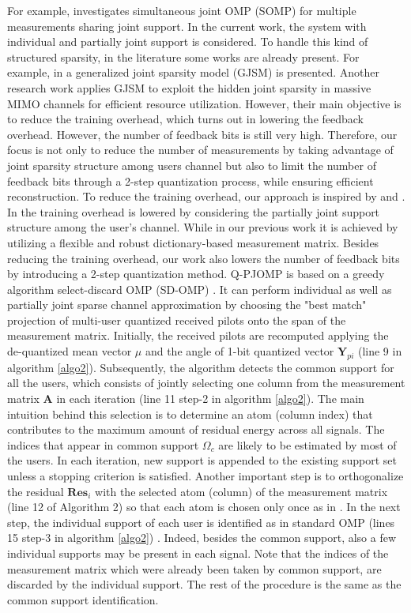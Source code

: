  For example, \cite{somp} investigates simultaneous joint OMP (SOMP) for multiple measurements sharing joint support. 
 In the current work, the system with individual and partially joint support is considered. To handle this kind of structured sparsity, in the literature some works are already present. For example, in \cite{SD-omp} a generalized joint sparsity model (GJSM) is presented.  Another research work \cite{mainref-joint} applies GJSM to exploit the hidden joint sparsity in massive MIMO channels for efficient resource utilization. However, their main objective is to reduce the training overhead, which turns out in lowering the feedback overhead. However, the number of feedback bits is still very high. 
Therefore, our focus is not only to reduce the number of measurements by taking advantage of joint sparsity structure among users channel but also to limit the number of feedback bits through a 2-step quantization process, while ensuring efficient reconstruction. To reduce the training overhead, our approach is inspired by \cite{mainref-joint} and \cite{ourwork}. In \cite{mainref-joint} the training overhead is lowered by considering the partially joint support structure among the user's channel. While in our previous work \cite{ourwork} it is achieved by utilizing a flexible and robust dictionary-based measurement matrix.
Besides reducing the training overhead, our work also lowers the number of feedback bits by introducing a 2-step quantization method.  
Q-PJOMP is based on a greedy algorithm select-discard OMP (SD-OMP) \cite{SD-omp}. It can perform individual as well as partially joint sparse channel approximation by choosing the "best match" projection of multi-user quantized received pilots onto the span of the measurement matrix.
 Initially, the received pilots are recomputed applying the de-quantized mean vector $\mu$ and the angle of 1-bit quantized vector $\mathbf{Y}_{pi}$ (line 9 in algorithm \ref{algo2}).  Subsequently, the algorithm detects the common support for all the users, which consists of jointly selecting one column from the measurement matrix $\mathbf{A}$  in each iteration (line 11 step-2 in algorithm \ref{algo2}). The main intuition behind this selection is to determine an atom (column index) that contributes to the maximum amount of residual energy across all signals\cite{SOMP_energy}.  The indices that appear in common support $\Omega_c$ are likely to be estimated by most of the users. In each iteration, new support is appended to the existing support set unless a stopping criterion is satisfied. 
Another important step is to orthogonalize the residual $\mathbf{Res}_i$ with the selected atom (column) of the measurement matrix (line 12 of Algorithm 2) so that each atom is chosen only once as in \cite{omp,somp}.  In the next step, the individual support of each user is identified as in standard OMP  (lines 15 step-3 in algorithm \ref{algo2})  \cite{omp}. Indeed, besides the common support, also a few individual supports may be present in each signal. Note that the indices of the measurement matrix which were already been taken by common support, are discarded by the individual support. The rest of the procedure is the same as the common support identification.
